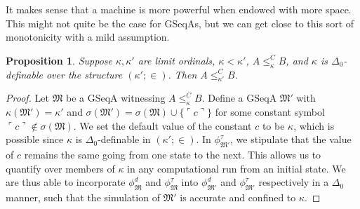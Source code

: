 \documentclass[12pt, twoside]{memoir}
\numberwithin{equation}{section}
\newtheorem{prop}[thm]{Proposition}
\theoremstyle{definition}
\theoremstyle{remark}
\theoremstyle{definition}
\theoremstyle{definition}
\theoremstyle{definition}
\theoremstyle{remark}
\begin{document}
It makes sense that a machine is more powerful when endowed with more space. This might not quite be the case for GSeqAs, but we can get close to this sort of monotonicity with a mild assumption.

\begin{prop}\label{prop246}
Suppose $\kappa, \kappa'$ are limit ordinals, $\kappa < \kappa'$, $A \leq^C_{\kappa} B$, and $\kappa$ is $\Delta_0$-definable over the structure $(\kappa'; \in)$. Then $A \leq^C_{\kappa'} B$.
\end{prop}

\begin{proof}
Let $\mathfrak{M}$ be a GSeqA witnessing $A \leq^C_{\kappa} B$. Define a GSeqA $\mathfrak{M}'$ with $\kappa(\mathfrak{M}') = \kappa'$ and $\sigma(\mathfrak{M}') = \sigma(\mathfrak{M}) \cup \{\ulcorner c \urcorner\}$ for some constant symbol $\ulcorner c \urcorner \not\in \sigma(\mathfrak{M})$. We set the default value of the constant $c$ to be $\kappa$, which is possible since $\kappa$ is $\Delta_0$-definable in $(\kappa'; \in)$. In $\phi^{\tau}_{\mathfrak{M}'}$, we stipulate that the value of $c$ remains the same going from one state to the next. This allows us to quantify over members of $\kappa$ in any computational run from an initial state. We are thus able to incorporate $\phi^d_{\mathfrak{M}}$ and $\phi^{\tau}_{\mathfrak{M}}$ into $\phi^d_{\mathfrak{M}'}$ and $\phi^{\tau}_{\mathfrak{M}'}$ respectively in a $\Delta_0$ manner, such that the simulation of $\mathfrak{M}'$ is accurate and confined to $\kappa$. 


\end{proof}
\end{document}

